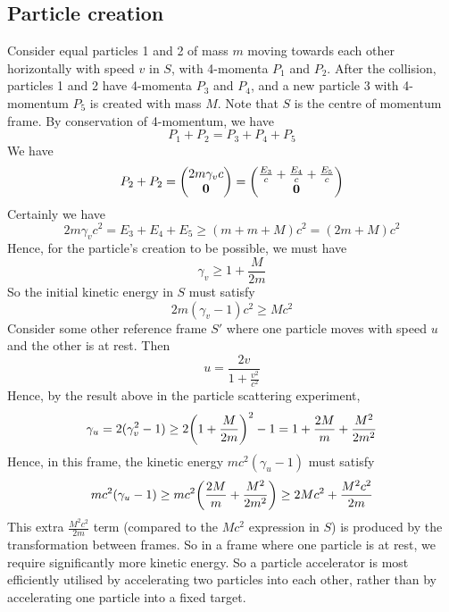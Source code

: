 \subsection{Particle creation}
Consider equal particles 1 and 2 of mass \(m\) moving towards each other horizontally with speed \(v\) in \(S\), with 4-momenta \(P_1\) and \(P_2\).
After the collision, particles 1 and 2 have 4-momenta \(P_3\) and \(P_4\), and a new particle 3 with 4-momentum \(P_5\) is created with mass \(M\).
Note that \(S\) is the centre of momentum frame.
By conservation of 4-momentum, we have
\[
	P_1 + P_2 = P_3 + P_4 + P_5
\]
We have
\[
	P_2 + P_2 = \begin{pmatrix}
		2m\gamma_v c \\ \vb 0
	\end{pmatrix} = \begin{pmatrix}
		\frac{E_3}{c} + \frac{E_4}{c} + \frac{E_5}{c} \\
		\vb 0
	\end{pmatrix}
\]
Certainly we have
\[
	2m\gamma_v c^2 = E_3 + E_4 + E_5 \geq (m + m + M)c^2 = (2m + M)c^2
\]
Hence, for the particle's creation to be possible, we must have
\[
	\gamma_v \geq 1 + \frac{M}{2m}
\]
So the initial kinetic energy in \(S\) must satisfy
\[
	2m(\gamma_v - 1)c^2 \geq Mc^2
\]
Consider some other reference frame \(S'\) where one particle moves with speed \(u\) and the other is at rest.
Then
\[
	u = \frac{2v}{1 + \frac{v^2}{c^2}}
\]
Hence, by the result above in the particle scattering experiment,
\[
	\gamma_u = 2(\gamma_v^2 - 1) \geq 2\qty(1 + \frac{M}{2m})^2 - 1 = 1 + \frac{2M}{m} + \frac{M^2}{2m^2}
\]
Hence, in this frame, the kinetic energy \(mc^2(\gamma_u - 1)\) must satisfy
\[
	mc^2(\gamma_u - 1) \geq mc^2\qty(\frac{2M}{m} + \frac{M^2}{2m^2}) \geq 2Mc^2 + \frac{M^2c^2}{2m}
\]
This extra \(\frac{M^2c^2}{2m}\) term (compared to the \(Mc^2\) expression in \(S\)) is produced by the transformation between frames.
So in a frame where one particle is at rest, we require significantly more kinetic energy.
So a particle accelerator is most efficiently utilised by accelerating two particles into each other, rather than by accelerating one particle into a fixed target.
